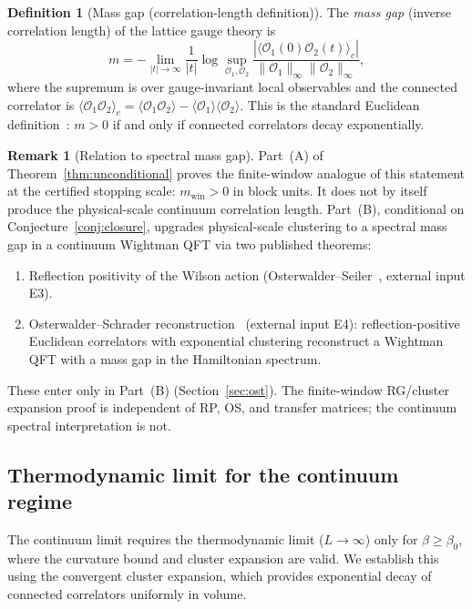 \documentclass[11pt]{article}
\theoremstyle{definition}
\newtheorem{definition}[theorem]{Definition}
\newtheorem{remark}[theorem]{Remark}
\begin{document}
\begin{definition}[Mass gap (correlation-length definition)]%
\label{def:massgap}
The \emph{mass gap} (inverse correlation length) of the lattice
gauge theory is
\begin{equation}
m=-\lim_{|t|\to\infty}\frac{1}{|t|}
\log\sup_{\mathcal{O}_1,\mathcal{O}_2}
\frac{|\langle\mathcal{O}_1(0)\mathcal{O}_2(t)\rangle_c|}
{\|\mathcal{O}_1\|_\infty\|\mathcal{O}_2\|_\infty},
\end{equation}
where the supremum is over gauge-invariant local observables
and the connected correlator is
$\langle\mathcal{O}_1\mathcal{O}_2\rangle_c
=\langle\mathcal{O}_1\mathcal{O}_2\rangle
-\langle\mathcal{O}_1\rangle\langle\mathcal{O}_2\rangle$.
This is the standard Euclidean definition~\cite{JaffeWitten}:
$m>0$ if and only if connected correlators decay
exponentially.
\end{definition}

\begin{remark}[Relation to spectral mass gap]%
\label{rem:OS-reconstruction}
Part~(A) of Theorem~\ref{thm:unconditional} proves the finite-window analogue of this statement at the certified stopping scale: $m_{\mathrm{win}}>0$ in block units.  It does not by itself produce the physical-scale continuum correlation length.  Part~(B), conditional on Conjecture~\ref{conj:closure}, upgrades physical-scale clustering to a spectral mass gap in a continuum Wightman QFT via two published theorems:
\begin{enumerate}[nosep]
\item Reflection positivity of the Wilson action
(Osterwalder--Seiler~\cite{OS78}, external input E3).
\item Osterwalder--Schrader reconstruction~\cite{OS73}
(external input E4):
reflection-positive Euclidean correlators with exponential
clustering reconstruct a Wightman QFT with a mass gap in
the Hamiltonian spectrum.
\end{enumerate}
These enter only in Part~(B) (Section~\ref{sec:ost}).  The finite-window RG/cluster expansion proof is independent of RP, OS, and transfer matrices; the continuum spectral interpretation is not.
\end{remark}

\subsection{Thermodynamic limit for the continuum regime}

The continuum limit requires the thermodynamic limit ($L\to\infty$)
only for $\beta\ge\beta_0$, where the curvature bound and cluster
expansion are valid.  We establish this using the convergent
cluster expansion, which provides exponential decay of connected
correlators uniformly in volume.
\end{document}
